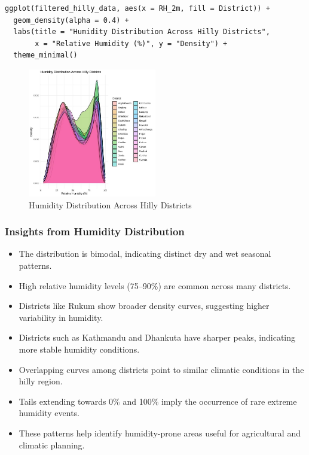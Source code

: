 \begin{verbatim}
ggplot(filtered_hilly_data, aes(x = RH_2m, fill = District)) +
  geom_density(alpha = 0.4) +
  labs(title = "Humidity Distribution Across Hilly Districts",
       x = "Relative Humidity (%)", y = "Density") +
  theme_minimal()
\end{verbatim}

\begin{figure}[h]
    \centering
    \includegraphics[width=0.5\textwidth]{figures/humid_hilly.jpg}
    \caption{Humidity Distribution Across Hilly Districts}
\end{figure}

\subsubsection*{Insights from Humidity Distribution}

\begin{itemize}
    \item The distribution is bimodal, indicating distinct dry and wet seasonal patterns.
    \item High relative humidity levels (75–90\%) are common across many districts.
    \item Districts like Rukum show broader density curves, suggesting higher variability in humidity.
    \item Districts such as Kathmandu and Dhankuta have sharper peaks, indicating more stable humidity conditions.
    \item Overlapping curves among districts point to similar climatic conditions in the hilly region.
    \item Tails extending towards 0\% and 100\% imply the occurrence of rare extreme humidity events.
    \item These patterns help identify humidity-prone areas useful for agricultural and climatic planning.
\end{itemize}


